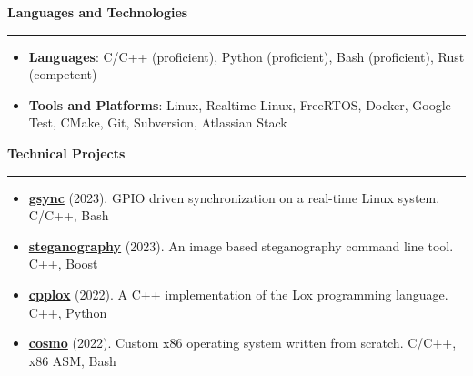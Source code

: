 \documentclass[12pt,letterpaper]{article}
\begin{document}
\medskip

\begin{large}
    \textbf{Languages and Technologies}
\end{large}

\smallskip \hrule \medskip

\begin{itemize}[topsep=0pt]
    \setlength\itemsep{0.2em}
    \item \textbf{Languages}: C/C++ (proficient),
                              Python (proficient),
                              Bash (proficient),
                              Rust (competent)
    \item \textbf{Tools and Platforms}: Linux,
                                        Realtime Linux,
                                        FreeRTOS,
                                        Docker,
                                        Google Test,
                                        CMake,
                                        Git,
                                        Subversion,
                                        Atlassian Stack
\end{itemize}

\medskip

\begin{large}
    \textbf{Technical Projects}
\end{large}

\smallskip \hrule \medskip

\begin{itemize}[topsep=0pt]
    \setlength\itemsep{0.2em}
    \item \textbf{\href{https://github.com/ivan-guerra/gsync.git}{gsync}}
        (2023). GPIO driven synchronization on a real-time Linux system. C/C++,
        Bash
    \item \textbf{\href{https://github.com/ivan-guerra/steganography.git}{steganography}}
        (2023). An image based steganography command line tool. C++, Boost
    \item \textbf{\href{https://github.com/ivan-guerra/cpplox.git}{cpplox}}
        (2022). A C++ implementation of the Lox programming language. C++,
        Python
    \item \textbf{
        \href{https://github.com/ivan-guerra/cosmo.git}{cosmo}}
        (2022). Custom x86 operating system written from scratch. C/C++, x86
        ASM, Bash
\end{itemize}
\end{document}
